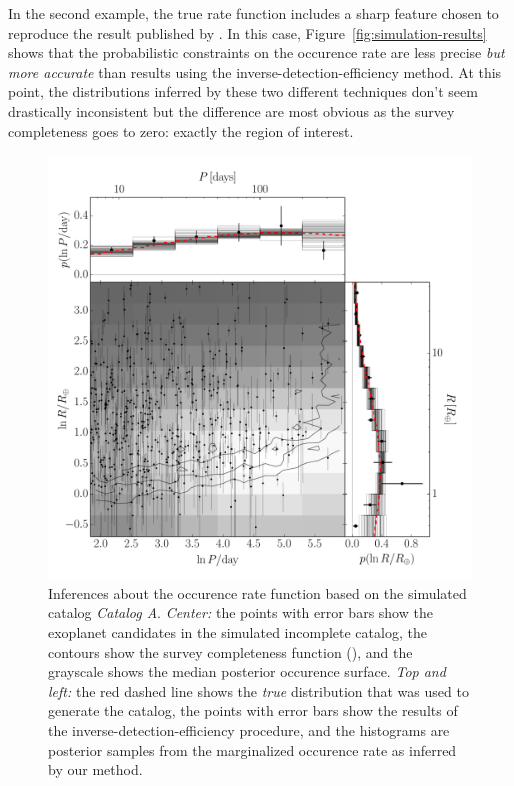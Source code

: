 \documentclass[12pt,preprint]{aastex}
\newcommand{\Fig}[1]{Figure~\ref{fig:#1}}
\newcommand{\fig}[1]{\Fig{#1}}
\newcommand{\figlabel}[1]{\label{fig:#1}}
\newcommand{\modela}{\emph{Catalog A}}
\begin{document}
In the second example, the true rate function includes a sharp feature chosen
to reproduce the result published by \citet{petigura}.
In this case, \fig{simulation-results} shows that the probabilistic
constraints on the occurence rate are less precise \emph{but more accurate}
than results using the inverse-detection-efficiency method.
At this point, the distributions inferred by these two different techniques
don't seem drastically inconsistent but the difference are most obvious as the
survey completeness goes to zero: exactly the region of interest.

\begin{figure}[p]
\begin{center}
\includegraphics[width=\textwidth]{figures/smooth/results.pdf}
\end{center}
\caption{%
Inferences about the occurence rate function based on the simulated catalog
\modela.
\emph{Center:} the points with error bars show the exoplanet candidates in the
simulated incomplete catalog, the contours show the survey completeness
function (\citealt{petigura}), and the grayscale shows the median posterior
occurence surface.
\emph{Top and left:} the red dashed line shows the \emph{true} distribution
that was used to generate the catalog, the points with error bars show the
results of the inverse-detection-efficiency procedure, and the histograms are
posterior samples from the marginalized occurence rate as inferred by our
method.
\figlabel{smooth-results}}
\end{figure}
\end{document}

